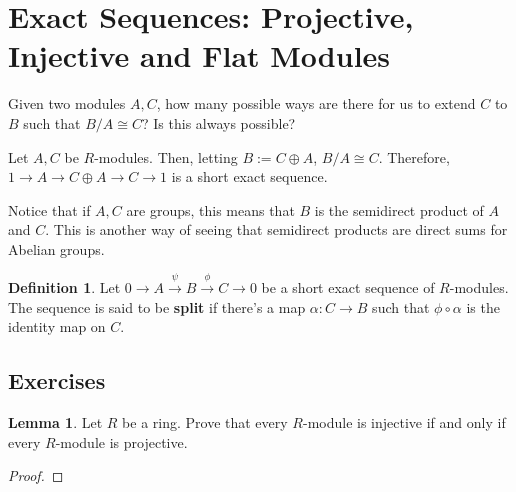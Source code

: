 \documentclass{article}
\theoremstyle{definition}
\newtheorem{definition}{Definition}
\newtheorem{lemma}[theorem]{Lemma}
\begin{document}
\newpage

\section{Exact Sequences: Projective, Injective and Flat Modules}

Given two modules $A,C$, how many possible ways are there for us to extend
$C$ to $B$ such that $B/A \cong C$? Is this always possible?

Let $A,C$ be $R$-modules. Then, letting $B := C \oplus A$, $B/A \cong C$.
Therefore, $1 \xrightarrow{} A \xrightarrow{} C \oplus A \xrightarrow{} C \xrightarrow{} 1$
is a short exact sequence.

Notice that if $A,C$ are groups, this means that $B$ is the semidirect product
of $A$ and $C$. This is another way of seeing that semidirect products are direct
sums for Abelian groups.

\begin{definition}
    Let $0 \xrightarrow{} A \xrightarrow{\psi} B \xrightarrow{\phi} C \xrightarrow{} 0$ be a 
    short exact sequence of $R$-modules. The sequence is said to be \textbf{split} if there's a map
    $\alpha: C \xrightarrow{} B$ such that $\phi \circ \alpha$ is the identity map on $C$.
\end{definition}



\subsection{Exercises}

\begin{lemma}
    Let $R$ be a ring. Prove that every $R$-module is injective if and only if
    every $R$-module is projective.
\end{lemma}
\begin{proof}
    
\end{proof}
\end{document}
